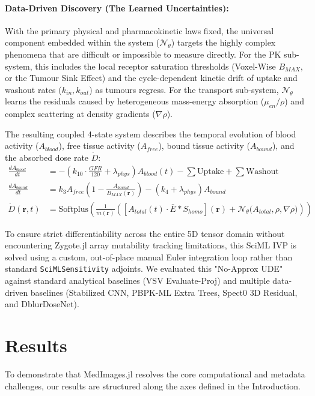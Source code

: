 \documentclass[10pt,letterpaper]{article}
\begin{document}
\paragraph{Data-Driven Discovery (The Learned Uncertainties):}
With the primary physical and pharmacokinetic laws fixed, the universal component embedded within the system ($\mathcal{N}_\theta$) targets the highly complex phenomena that are difficult or impossible to measure directly. For the PK sub-system, this includes the local receptor saturation thresholds (Voxel-Wise $B_{MAX}$, or the Tumour Sink Effect) and the cycle-dependent kinetic drift of uptake and washout rates ($k_{in}, k_{out}$) as tumours regress. For the transport sub-system, $\mathcal{N}_\theta$ learns the residuals caused by heterogeneous mass-energy absorption ($\mu_{en}/\rho$) and complex scattering at density gradients ($\nabla \rho$).

The resulting coupled 4-state system describes the temporal evolution of blood activity ($A_{blood}$), free tissue activity ($A_{free}$), bound tissue activity ($A_{bound}$), and the absorbed dose rate $\dot{D}$:
\begin{align}
    \frac{dA_{blood}}{dt} &= -\left(k_{10} \cdot \frac{GFR}{120} + \lambda_{phys} \right) A_{blood}(t) - \sum \text{Uptake} + \sum \text{Washout} \\
    \frac{dA_{bound}}{dt} &= k_3 A_{free} \left( 1 - \frac{A_{bound}}{B_{MAX}(\mathbf{r})} \right) - (k_4 + \lambda_{phys}) A_{bound} \\
    \dot{D}(\mathbf{r}, t) &= \text{Softplus} \left( \frac{1}{m(\mathbf{r})} \left( \left[ A_{total}(t) \cdot \bar{E} \ast S_{homo} \right](\mathbf{r}) + \mathcal{N}_\theta \Big( A_{total}, \rho, \nabla \rho \Big) \right) \right)
\end{align}

To ensure strict differentiability across the entire 5D tensor domain without encountering Zygote.jl array mutability tracking limitations, this SciML IVP is solved using a custom, out-of-place manual Euler integration loop rather than standard \texttt{SciMLSensitivity} adjoints. We evaluated this "No-Approx UDE" against standard analytical baselines (VSV Evaluate-Proj) and multiple data-driven baselines (Stabilized CNN, PBPK-ML Extra Trees, Spect0 3D Residual, and DblurDoseNet).


\section{Results}
To demonstrate that MedImages.jl resolves the core computational and metadata challenges, our results are structured along the axes defined in the Introduction.
\end{document}
